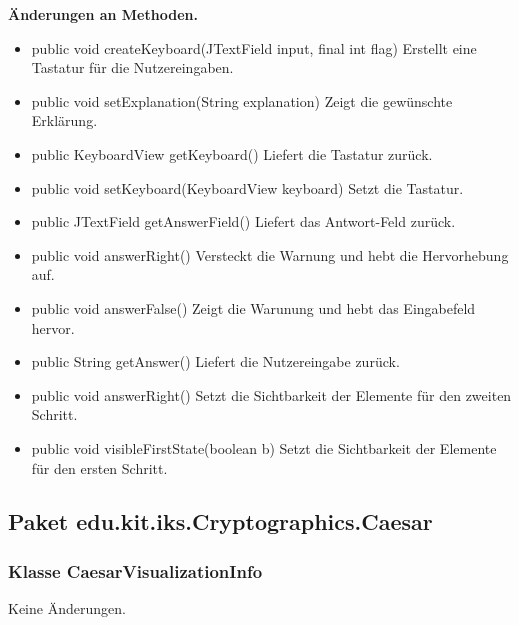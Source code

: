 \documentclass{article}
\begin{document}
    \textbf{Änderungen an Methoden.}
      \begin{itemize}
		\item public void createKeyboard(JTextField input, final int flag)\newline
              Erstellt eine Tastatur für die Nutzereingaben.
		\item public void setExplanation(String explanation)\newline
              Zeigt die gewünschte Erklärung.
		\item public KeyboardView getKeyboard()\newline
              Liefert die Tastatur zurück.
		\item public void setKeyboard(KeyboardView keyboard)\newline
              Setzt die Tastatur.
		\item public JTextField getAnswerField()\newline
              Liefert das Antwort-Feld zurück.
		\item public void answerRight()\newline
              Versteckt die Warnung und hebt die Hervorhebung auf.
		\item public void answerFalse()\newline
              Zeigt die Warunung und hebt das Eingabefeld hervor. 
		\item public String getAnswer()\newline
              Liefert die Nutzereingabe zurück. 
		\item public void answerRight()\newline
              Setzt die Sichtbarkeit der Elemente für den zweiten Schritt.		 
		\item public void visibleFirstState(boolean b)\newline
              Setzt die Sichtbarkeit der Elemente für den ersten Schritt.	 
	  \end{itemize}

  \subsection{Paket edu.kit.iks.Cryptographics.Caesar}
  
  	\subsubsection{Klasse CaesarVisualizationInfo}
  	 Keine Änderungen.
\end{document}
